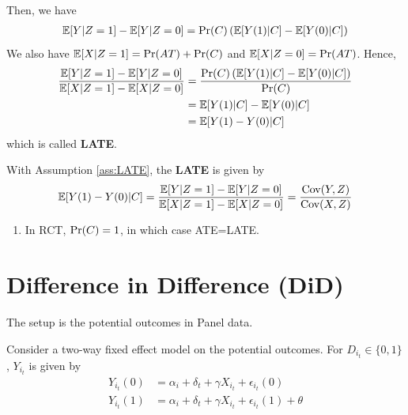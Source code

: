 \documentclass[11pt]{elegantbook}
\begin{document}
Then, we have
\begin{equation}
    \begin{aligned}
        \mathbb{E}[Y|Z=1]-\mathbb{E}[Y|Z=0]=\textnormal{Pr}(C)\left(\mathbb{E}[Y(1)|C]-\mathbb{E}[Y(0)|C]\right)
    \end{aligned}
    \nonumber
\end{equation}
We also have $\mathbb{E}[X|Z=1]=\textnormal{Pr}(AT)+\textnormal{Pr}(C)$ and $\mathbb{E}[X|Z=0]=\textnormal{Pr}(AT)$. Hence,
\begin{equation}
    \begin{aligned}
        \frac{\mathbb{E}[Y|Z=1]-\mathbb{E}[Y|Z=0]}{\mathbb{E}[X|Z=1]-\mathbb{E}[X|Z=0]}&=\frac{\textnormal{Pr}(C)\left(\mathbb{E}[Y(1)|C]-\mathbb{E}[Y(0)|C]\right)}{\textnormal{Pr}(C)}\\
        &=\mathbb{E}[Y(1)|C]-\mathbb{E}[Y(0)|C]\\
        &=\mathbb{E}[Y(1)-Y(0)|C]
    \end{aligned}
    \nonumber
\end{equation}
which is called \textbf{LATE}.

\begin{proposition}
    With Assumption \ref{ass:LATE}, the \textbf{LATE} is given by
    \begin{equation}
        \begin{aligned}
            \mathbb{E}[Y(1)-Y(0)|C]=\frac{\mathbb{E}[Y|Z=1]-\mathbb{E}[Y|Z=0]}{\mathbb{E}[X|Z=1]-\mathbb{E}[X|Z=0]}=\frac{\textnormal{Cov}(Y,Z)}{\textnormal{Cov}(X,Z)}
        \end{aligned}
        \nonumber
    \end{equation}
\end{proposition}

\begin{remark}
    \begin{enumerate}
        \item In RCT, $\textnormal{Pr}(C)=1$, in which case ATE=LATE.
    \end{enumerate}
\end{remark}


\section{Difference in Difference (DiD)}
The setup is the potential outcomes in Panel data.

Consider a two-way fixed effect model on the potential outcomes. For $D_{i_t}\in\{0,1\}$, $Y_{i_t}$ is given by
\begin{equation}
    \begin{aligned}
        Y_{i_t}(0)&=\alpha_i+\delta_t+\gamma X_{i_t}+\epsilon_{i_t}(0)\\
        Y_{i_t}(1)&=\alpha_i+\delta_t+\gamma X_{i_t}+\epsilon_{i_t}(1)+\theta
    \end{aligned}
    \nonumber
\end{equation}
\end{document}
